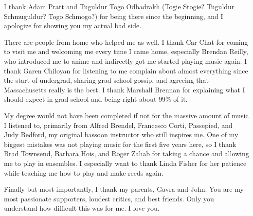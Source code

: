 \documentclass[%
  class = article,%
  crop = false,%
  float = true,%
  multi = true,%
  preview = false,%
]{standalone}
\begin{document}
I thank Adam Pratt and Tuguldur Togo Odbadrakh (Togie Stogie? Tuguldur Schmuguldur? Togo Schmogo?) for being there since the beginning, and I apologize for showing you my actual bad side.

There are people from home who helped me as well. I thank Car Chat for coming to visit me and welcoming me every time I came home, especially Brendan Reilly, who introduced me to anime and indirectly got me started playing music again. I thank Garen Chiloyan for listening to me complain about almost everything since the start of undergrad, sharing grad school gossip, and agreeing that Massachusetts really is the best. I thank Marshall Brennan for explaining what I should expect in grad school and being right about 99\% of it.

My degree would not have been completed if not for the massive amount of music I listened to, primarily from Alfred Brendel, Francesco Corti, Passepied, and Judy Bedford, my original bassoon instructor who still inspires me. One of my biggest mistakes was not playing music for the first five years here, so I thank Brad Townsend, Barbara Hois, and Roger Zahab for taking a chance and allowing me to play in ensembles. I especially want to thank Linda Fisher for her patience while teaching me how to play and make reeds again.

Finally but most importantly, I thank my parents, Gavra and John. You are my most passionate supporters, loudest critics, and best friends. Only you understand how difficult this was for me. I love you.
\end{document}
